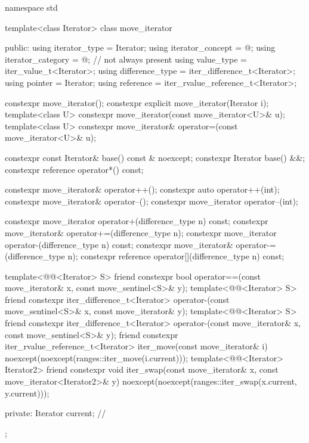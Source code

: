%
\begin{codeblock}
namespace std {
  template<class Iterator>
  class move_iterator {
  public:
    using iterator_type     = Iterator;
    using iterator_concept  = @\seebelow@;
    using iterator_category = @\seebelow@;                      // not always present
    using value_type        = iter_value_t<Iterator>;
    using difference_type   = iter_difference_t<Iterator>;
    using pointer           = Iterator;
    using reference         = iter_rvalue_reference_t<Iterator>;

    constexpr move_iterator();
    constexpr explicit move_iterator(Iterator i);
    template<class U> constexpr move_iterator(const move_iterator<U>& u);
    template<class U> constexpr move_iterator& operator=(const move_iterator<U>& u);

    constexpr const Iterator& base() const & noexcept;
    constexpr Iterator base() &&;
    constexpr reference operator*() const;

    constexpr move_iterator& operator++();
    constexpr auto operator++(int);
    constexpr move_iterator& operator--();
    constexpr move_iterator operator--(int);

    constexpr move_iterator operator+(difference_type n) const;
    constexpr move_iterator& operator+=(difference_type n);
    constexpr move_iterator operator-(difference_type n) const;
    constexpr move_iterator& operator-=(difference_type n);
    constexpr reference operator[](difference_type n) const;

    template<@@<Iterator> S>
      friend constexpr bool
        operator==(const move_iterator& x, const move_sentinel<S>& y);
    template<@@<Iterator> S>
      friend constexpr iter_difference_t<Iterator>
        operator-(const move_sentinel<S>& x, const move_iterator& y);
    template<@@<Iterator> S>
      friend constexpr iter_difference_t<Iterator>
        operator-(const move_iterator& x, const move_sentinel<S>& y);
    friend constexpr iter_rvalue_reference_t<Iterator>
      iter_move(const move_iterator& i)
        noexcept(noexcept(ranges::iter_move(i.current)));
    template<@@<Iterator> Iterator2>
      friend constexpr void
        iter_swap(const move_iterator& x, const move_iterator<Iterator2>& y)
          noexcept(noexcept(ranges::iter_swap(x.current, y.current)));

  private:
    Iterator current;   // \expos
  };
}
\end{codeblock}


